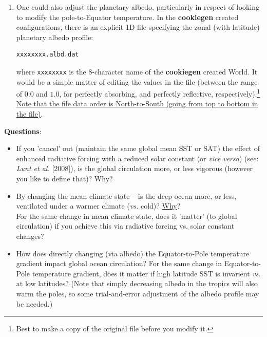 \begin{enumerate}
\begin{enumerate}
\vspace{1mm}
\item One could also adjust the planetary albedo, particularly in respect of looking to modify the pole-to-Equator temperature. In the \textbf{cookiegen} created configurations, there is an explicit 1D file specifying the zonal (with latitude) planetary albedo profile:
\vspace{-1mm}\small\begin{verbatim}
xxxxxxxx.albd.dat
\end{verbatim}\normalsize\vspace{-1mm}
where \texttt{xxxxxxxx} is the 8-character name of the \textbf{cookiegen} created World. It would be a simple matter of editing the values in the file (between the range of $0.0$ and $1.0$, for  perfectly absorbing, and perfectly reflective, respectively).\footnote{Best to make a copy of the original file before you modify it.} \uline{Note that the file data order is North-to-South (going from top to bottom in the file)}.

\end{enumerate}

\end{enumerate}

\newpage

\noindent \textbf{Questions}:

\begin{itemize}
\vspace{1mm}
\item If you 'cancel' out (maintain the same global mean SST or SAT) the effect of enhanced radiative forcing with a reduced solar constant (or \textit{vice versa}) (see: \textit{Lunt et al.} [2008]), is the global circulation more, or less vigorous (however you like to define that)? Why?
\vspace{1mm}
\item By changing the mean climate state -- is the deep ocean more, or less, ventilated under a warmer climate (\textit{vs.} cold)? \uline{Why}?
\\For the same change in mean climate state, does it 'matter' (to global circulation) if you achieve this via radiative forcing vs. solar constant changes?
\vspace{1mm}
\item How does directly changing (via albedo) the Equator-to-Pole temperature gradient impact global ocean circulation? For the same change in Equator-to-Pole temperature gradient, does it matter if high latitude SST is invarient \textit{vs.} at low latitudes? (Note that simply decreasing albedo in the tropics will also warm the poles, so some trial-and-error adjustment of the albedo profile may be needed.)

\end{itemize}

